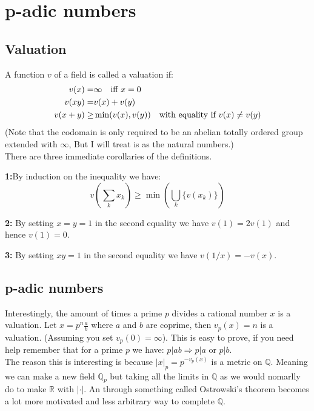 
\section{p-adic numbers}
\subsection{Valuation}
A function $v$ of a field is called a valuation if:
\begin{equation*}
\begin{aligned}
	v(x) =& \infty \text{\quad iff } x = 0 \\
	v(xy) =& v(x)+v(y) \\
	v(x+y) \geq& \min(v(x),v(y)) \text{\quad with equality if } v(x) \neq v(y) \\
\end{aligned}
\end{equation*}
(Note that the codomain is only required to be an abelian totally ordered group extended with $\infty$,
But I will treat is as the natural numbers.)
\\

There are three immediate corollaries of the definitions.

{\textbf{1:}}By induction on the inequality we have:
\[v\left(\sum_k x_k\right) \geq \min\left(\bigcup_k \{v(x_k)\}\right)\]

{\textbf{2:}} By setting $x=y=1$ in the second equality we have $v(1)=2v(1)$ and hence $v(1) = 0$.

{\textbf{3:}} By setting $xy=1$ in the second equality we have $v(1/x)=-v(x)$.

\subsection{p-adic numbers}
Interestingly, the amount of times a prime $p$ divides a rational number $x$ is a valuation.
Let $x = p^n\frac{a}{b}$ where $a$ and $b$ are coprime, then $v_p(x) = n$ is a valuation.
(Assuming you set $v_p(0) = \infty$).
This is easy to prove, if you need help remember that for a prime $p$ we have: $p | ab \Rightarrow p|a$ or $p|b$.
\\

The reason this is interesting is because $|x|_p = p^{-v_p(x)}$ is a metric on $\mathbb{Q}$.
Meaning we can make a new field $\mathbb{Q}_p$ but taking all the limits in $\mathbb{Q}$ as we would nomarlly do to make $\mathbb{R}$ with $|\cdot|$.
An through something called Ostrowski's theorem becomes a lot more motivated and less arbitrary way to complete $\mathbb{Q}$.
\\

